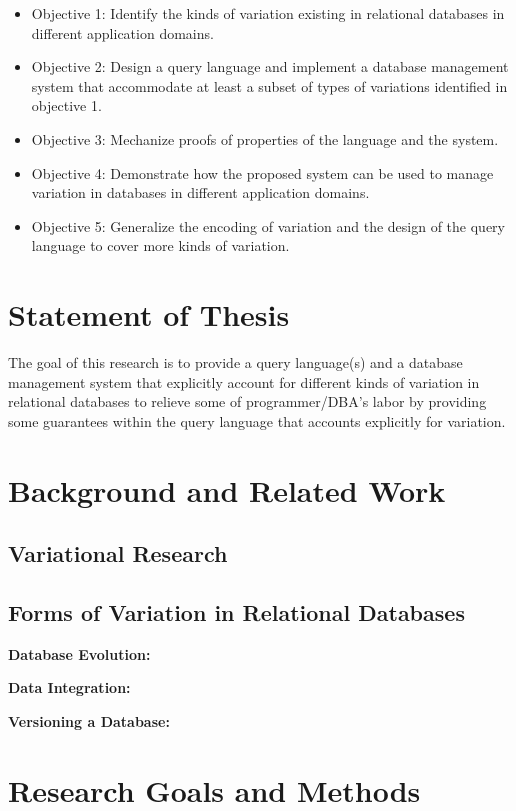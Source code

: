 \documentclass[11pt]{article}
\begin{document}
\begin{itemize}
\item Objective 1: Identify the kinds of variation existing in relational databases in 
different application domains.
\item Objective 2: Design a query language and implement a database management 
system that accommodate at least a subset of types of variations identified in objective 1.
\item Objective 3: Mechanize proofs of properties of the language and the system.
\item Objective 4: Demonstrate how the proposed system can be used to manage
variation in databases in different application domains.
\item Objective 5: Generalize the encoding of variation and the design of the query 
language to cover more kinds of variation.
\end{itemize}

\section{Statement of Thesis}
\label{sec:stmt}
The goal of this research is to provide a query language(s) and a database management 
system that explicitly account for different kinds of variation in relational databases to relieve 
some of programmer/DBA's labor by providing some guarantees within the query 
language that accounts explicitly for variation.


\section{Background and Related Work}
\label{sec:rw}

\subsection{Variational Research}
\label{sec:var-res}

\subsection{Forms of Variation in Relational Databases}
\label{sec:var-in-db}

\textbf{Database Evolution:}

\textbf{Data Integration:}

\textbf{Versioning a Database:}


\section{Research Goals and Methods}
\label{sec:goals}
\end{document}
